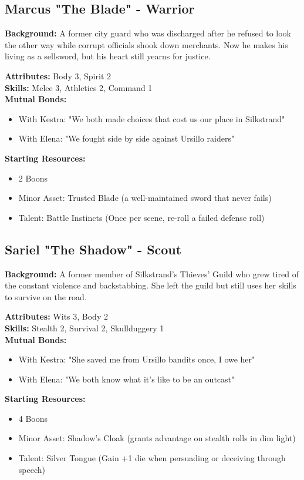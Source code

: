 \documentclass[11pt]{article}
\newenvironment{characterbox}[1]{%
  \begin{mdframed}[backgroundcolor=shadecolor, linewidth=1pt, linecolor=headercolor]%
  \subsection*{#1}%
}{%
  \end{mdframed}%
}
\begin{document}
\begin{characterbox}{Marcus "The Blade" - Warrior}
\textbf{Background:} A former city guard who was discharged after he refused to look the other way while corrupt officials shook down merchants. Now he makes his living as a sellsword, but his heart still yearns for justice.

\textbf{Attributes:} Body 3, Spirit 2 \\
\textbf{Skills:} Melee 3, Athletics 2, Command 1 \\
\textbf{Mutual Bonds:} 
\begin{itemize}
\item With Kestra: "We both made choices that cost us our place in Silkstrand"
\item With Elena: "We fought side by side against Ursillo raiders"
\end{itemize}

\textbf{Starting Resources:}
\begin{itemize}
\item 2 Boons
\item Minor Asset: Trusted Blade (a well-maintained sword that never fails)
\item Talent: Battle Instincts (Once per scene, re-roll a failed defense roll)
\end{itemize}
\end{characterbox}

\begin{characterbox}{Sariel "The Shadow" - Scout}
\textbf{Background:} A former member of Silkstrand's Thieves' Guild who grew tired of the constant violence and backstabbing. She left the guild but still uses her skills to survive on the road.

\textbf{Attributes:} Wits 3, Body 2 \\
\textbf{Skills:} Stealth 2, Survival 2, Skullduggery 1 \\
\textbf{Mutual Bonds:} 
\begin{itemize}
\item With Kestra: "She saved me from Ursillo bandits once, I owe her"
\item With Elena: "We both know what it's like to be an outcast"
\end{itemize}

\textbf{Starting Resources:}
\begin{itemize}
\item 4 Boons
\item Minor Asset: Shadow's Cloak (grants advantage on stealth rolls in dim light)
\item Talent: Silver Tongue (Gain +1 die when persuading or deceiving through speech)
\end{itemize}
\end{characterbox}
\end{document}
